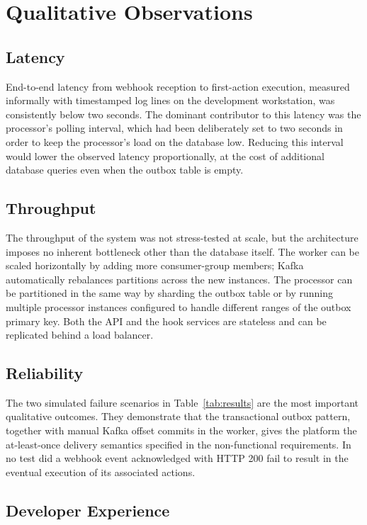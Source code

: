 \section{Qualitative Observations}

\subsection{Latency}

End-to-end latency from webhook reception to first-action execution, measured informally with timestamped log lines on the development workstation, was consistently below two seconds. The dominant contributor to this latency was the processor's polling interval, which had been deliberately set to two seconds in order to keep the processor's load on the database low. Reducing this interval would lower the observed latency proportionally, at the cost of additional database queries even when the outbox table is empty.

\subsection{Throughput}

The throughput of the system was not stress-tested at scale, but the architecture imposes no inherent bottleneck other than the database itself. The worker can be scaled horizontally by adding more consumer-group members; Kafka automatically rebalances partitions across the new instances. The processor can be partitioned in the same way by sharding the outbox table or by running multiple processor instances configured to handle different ranges of the outbox primary key. Both the API and the hook services are stateless and can be replicated behind a load balancer.

\subsection{Reliability}

The two simulated failure scenarios in Table~\ref{tab:results} are the most important qualitative outcomes. They demonstrate that the transactional outbox pattern, together with manual Kafka offset commits in the worker, gives the platform the at-least-once delivery semantics specified in the non-functional requirements. In no test did a webhook event acknowledged with HTTP 200 fail to result in the eventual execution of its associated actions.

\subsection{Developer Experience}

